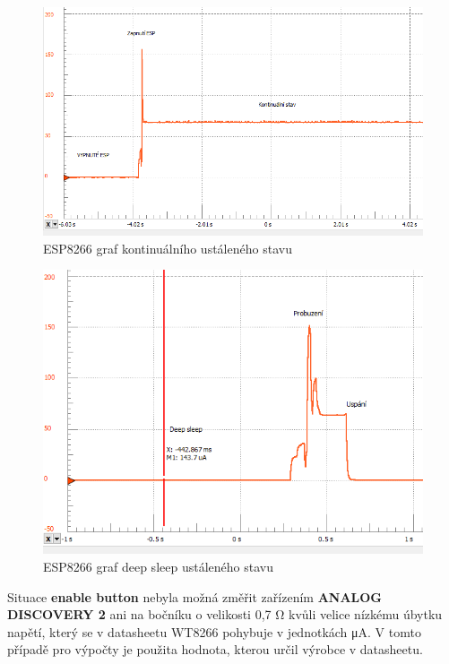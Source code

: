 \documentclass[a4paper, 12pt]{report}
\begin{document}
    \begin{figure}[h]
        \centering
        \includegraphics[width=13cm]{images/ESP8266_on_waiting}
        \caption{ESP8266 graf kontinuálního ustáleného stavu }
        \label{fig:esp8266_on_waiting}
    \end{figure}
    \begin{figure}[h]
        \centering
        \includegraphics[width=13cm]{images/ESP8266_deepsleep_waiting}
        \caption{ESP8266 graf deep sleep ustáleného stavu}
        \label{fig:esp8266_deepsleep_waiting}
    \end{figure}

    Situace \textbf{enable button} nebyla možná změřit zařízením \textbf{ANALOG DISCOVERY 2} ani na bočníku o velikosti 0,7 \si{\ohm} kvůli velice nízkému úbytku napětí, který se v datasheetu WT8266 pohybuje v jednotkách \si{\micro A}. V tomto případě pro výpočty je použita hodnota, kterou určil výrobce v datasheetu.
\end{document}
